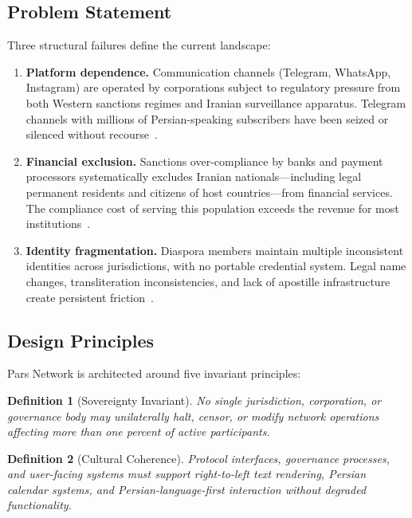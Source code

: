 \documentclass[11pt,a4paper]{article}
\newtheorem{definition}{Definition}
\begin{document}
\subsection{Problem Statement}

Three structural failures define the current landscape:

\begin{enumerate}[label=(\roman*)]
    \item \textbf{Platform dependence.} Communication channels (Telegram, WhatsApp, Instagram) are operated by corporations subject to regulatory pressure from both Western sanctions regimes and Iranian surveillance apparatus. Telegram channels with millions of Persian-speaking subscribers have been seized or silenced without recourse~\cite{marczak2015iran}.

    \item \textbf{Financial exclusion.} Sanctions over-compliance by banks and payment processors systematically excludes Iranian nationals---including legal permanent residents and citizens of host countries---from financial services. The compliance cost of serving this population exceeds the revenue for most institutions~\cite{ofac_iran_2022}.

    \item \textbf{Identity fragmentation.} Diaspora members maintain multiple inconsistent identities across jurisdictions, with no portable credential system. Legal name changes, transliteration inconsistencies, and lack of apostille infrastructure create persistent friction~\cite{unhcr_stateless_2021}.
\end{enumerate}

\subsection{Design Principles}

Pars Network is architected around five invariant principles:

\begin{definition}[Sovereignty Invariant]
No single jurisdiction, corporation, or governance body may unilaterally halt, censor, or modify network operations affecting more than one percent of active participants.
\end{definition}

\begin{definition}[Cultural Coherence]
Protocol interfaces, governance processes, and user-facing systems must support right-to-left text rendering, Persian calendar systems, and Persian-language-first interaction without degraded functionality.
\end{definition}
\end{document}
